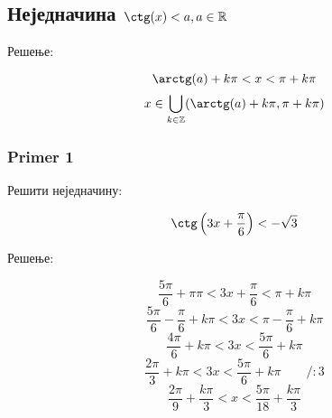 \documentclass[../diplomski.tex]{subfiles}
\begin{document}
\subsection{Неједначина $\ctg(x)<a,a\in\mathbb{R}$}

Решење:

\[\arctg(a)+k\pi<x<\pi+k\pi\]
\[x\in\bigcup_{k\in\mathbb{Z}}(\arctg(a)+k\pi,\pi+k\pi)\]

\subsubsection{Primer 1}

Решити неједначину:

\[\ctg\left(3x+\frac{\pi}{6}\right)<-\sqrt{3}\]

Решење:

\[\frac{5\pi}{6}+\pi\pi<3x+\frac{\pi}{6}<\pi+k\pi\]
\[\frac{5\pi}{6}-\frac{\pi}{6}+k\pi<3x<\pi-\frac{\pi}{6}+k\pi\]
\[\frac{4\pi}{6}+k\pi<3x<\frac{5\pi}{6}+k\pi\]
\[\frac{2\pi}{3}+k\pi<3x<\frac{5\pi}{6}+k\pi\qquad/:3\]
\[\frac{2\pi}{9}+\frac{k\pi}{3}<x<\frac{5\pi}{18}+\frac{k\pi}{3}\]
\end{document}
